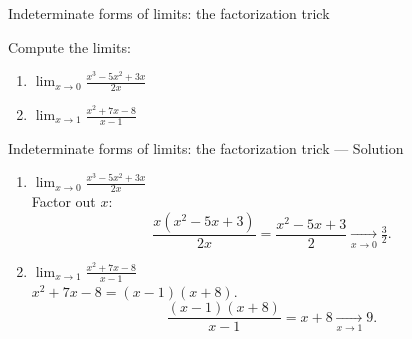 \documentclass[9pt]{beamer}
\begin{document}
\begin{frame}{Indeterminate forms of limits: the factorization trick}

    Compute the limits:

    \begin{enumerate}[leftmargin = 0.5cm, label = (\alph*), rightmargin = 0.2cm]

        \item $\lim_{x\rightarrow 0} \frac{x^3 - 5x^2 + 3x}{2x}$

        \item $\lim_{x\to 1}\frac{x^2+7x-8}{x-1}$

    \end{enumerate}

\end{frame}

\begin{frame}{Indeterminate forms of limits: the factorization trick — Solution}

\begin{enumerate}[leftmargin=0.5cm, label=(\alph*), rightmargin=0.2cm]

\item $\displaystyle \lim_{x\to 0}\frac{x^3-5x^2+3x}{2x}$ \\
Factor out $x$:
\[
\frac{x(x^2-5x+3)}{2x}=\frac{x^2-5x+3}{2}\xrightarrow[x\to 0]{} \boxed{\tfrac{3}{2}}.
\]

\item $\displaystyle \lim_{x\to 1}\frac{x^2+7x-8}{x-1}$ \\
$ x^2+7x-8=(x-1)(x+8)$.
\[
\frac{(x-1)(x+8)}{x-1}=x+8\xrightarrow[x\to 1]{}\boxed{9}.
\]

\end{enumerate}

\end{frame}
\end{document}
